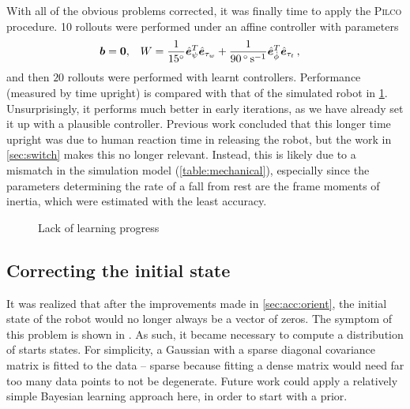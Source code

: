 \documentclass[main.tex]{subfiles}
\begin{document}
	With all of the obvious problems corrected, it was finally time to apply the \textsc{Pilco} procedure.
	10 rollouts were performed under an affine controller with parameters
	\begin{align}
		\bm{b} &= \bm{0}, &
		W &=
			\frac{1}{\SI{15}{\degree}}
			\hat{\bm{e}}_{\psi}^T\hat{\bm{e}}_{\tau_w}
			+ \frac{1}{\SI{90}{\degree\per\second}}
			\hat{\bm{e}}_{\dot\phi}^T\hat{\bm{e}}_{\tau_t}\,,
	\end{align}
	and then $20$ rollouts were performed with learnt controllers.
	Performance (measured by time upright) is compared with that of the simulated robot in \cref{fig:learning-compare}.
	Unsurprisingly, it performs much better in early iterations, as we have already set it up with a plausible controller.
	Previous work \cite{aleksi} concluded that this longer time upright was due to human reaction time in releasing the robot, but the work in \cref{sec:switch} makes this no longer relevant.
	Instead, this is likely due to a mismatch in the simulation model (\cref{table:mechanical}), especially since the parameters determining the rate of a fall from rest are the frame moments of inertia, which were estimated with the least accuracy.
	\begin{figure}
		
		\caption{Lack of learning progress}
		\label{fig:learning-compare}
	\end{figure}

	\subsection{Correcting the initial state}
	It was realized that after the improvements made in \cref{sec:acc:orient}, the initial state of the robot would no longer always be a vector of zeros. The symptom of this problem is shown in \todo{}.
	As such, it became necessary to compute a distribution of starts states.
	For simplicity, a Gaussian with a sparse diagonal covariance matrix is fitted to the data -- sparse because fitting a dense matrix would need far too many data points to not be degenerate. Future work could apply a relatively simple Bayesian learning approach here, in order to start with a prior.

\bib
\end{document}
